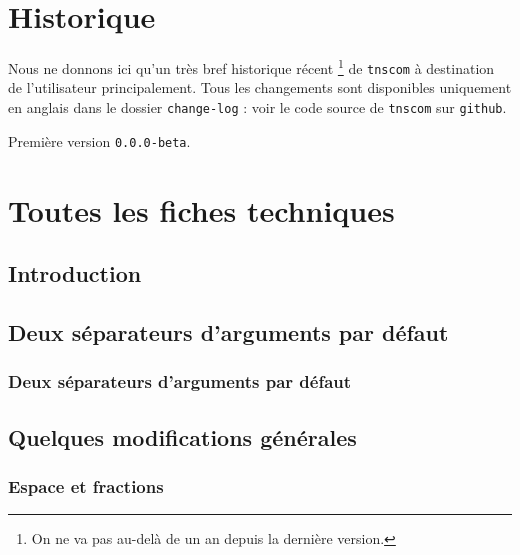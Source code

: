 \documentclass[12pt,a4paper]{article}
\theoremstyle{definition}
\begin{document}
{{{{{{{{{{{\section{Historique}

Nous ne donnons ici qu'un très bref historique récent
\footnote{
	On ne va pas au-delà de un an depuis la dernière version.
}
de \verb+tnscom+ à destination de l'utilisateur principalement.
Tous les changements sont disponibles uniquement en anglais dans le dossier \verb+change-log+ : voir le code source de \verb+tnscom+ sur \verb+github+.

\begin{description}

    \medskip
    \item[2020-07-10] Première version \verb+0.0.0-beta+.

\end{description}


\newpage
\section{Toutes les fiches techniques} \label{techincal-ids}

\subsection{Introduction}
\subsection{Deux séparateurs d'arguments par défaut}

\subsubsection{Deux séparateurs d'arguments par défaut}


\subsection{Quelques modifications générales}
\subsubsection{Espace et fractions}



}}}}}}}}}}}
\end{document}
